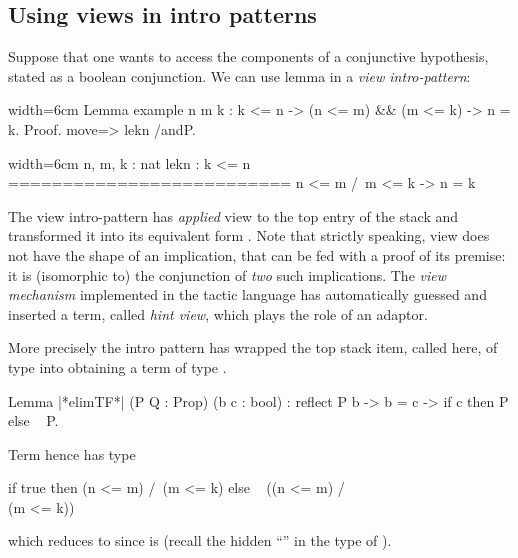 \subsection{Using views in intro patterns}

Suppose that one wants to access the components of a
conjunctive hypothesis, stated as a boolean conjunction.
We can use lemma  in a \emph{view intro-pattern}:

\begin{coq}{}{width=6cm}
Lemma example n m k : k <= n ->
  (n <= m) && (m <= k) -> n = k.
Proof.
move=> lekn /andP.
\end{coq}
\begin{coqout}{}{width=6cm}
n, m, k : nat
lekn : k <= n
==========================
 n <= m /\ m <= k -> n = k
\end{coqout}

The view intro-pattern  has \emph{applied} view  to
the top entry of the stack  and transformed it into
its equivalent form . Note that strictly
speaking, view  does not have the shape of an implication,
that can be fed with a proof of its premise: it is (isomorphic to) the
conjunction of \emph{two} such implications. The \emph{view mechanism}
implemented in the tactic language has automatically guessed and
inserted a term, called \emph{hint view}, which plays the role of an
adaptor.

More precisely the  intro pattern has wrapped the top
stack item, called  here, of type  into
 obtaining a term of type
.

\begin{coq}{}{}
Lemma |*elimTF*| (P Q : Prop) (b c : bool) :
  reflect P b -> b = c -> if c then P else ~ P.
\end{coq}
Term  hence has type

\begin{coq}{}{}
if true then (n <= m) /\ (m <= k) else ~ ((n <= m) /\\ (m <= k))
\end{coq}
which reduces to  since  is 
(recall the hidden ``'' in the type of ).  

